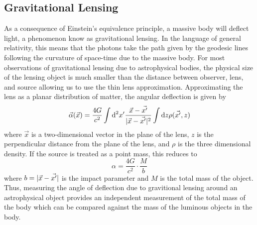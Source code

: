 \subsection{Gravitational Lensing}
\label{sec:dm_lensing}

As a consequence of Einstein's equivalence principle, a massive body will deflect light, a phenomenon know as gravitational lensing.
In the language of general relativity, this means that the photons take the path given by the geodesic lines following the curvature of space-time due to the massive body.
For most observations of gravitational lensing due to astrophysical bodies, the physical size of the lensing object is much smaller than the distance between observer, lens, and source allowing us to use the thin lens approximation.
Approximating the lens as a planar distribution of matter, the angular deflection is given by 
\begin{equation}
  \vec \alpha (\vec x) = \frac{4G}{c^2} \int \text{d}^2 x' \frac{\vec x - \vec {x'}}{\lvert \vec x - \vec{x'} \rvert^2} 
  \int \text{d} z \rho(\vec{x'}, z)
\end{equation}
where $\vec x$ is a two-dimensional vector in the plane of the lens, $z$ is the perpendicular distance from the plane of the lens, and  $\rho$ is the three dimensional density.
If the source is treated as a point mass, this reduces to
\begin{equation}
  \alpha = \frac{ 4 G} {c^2} \cdot \frac{M}{b}
\end{equation}
where $b = \lvert \vec x - \vec{x'} \rvert$ is the impact parameter and $M$ is the total mass of the object.
Thus, measuring the angle of deflection due to gravitional lensing around an astrophysical object provides an independent measurement of the total mass of the body which can be compared against the mass of the luminous objects in the body.

